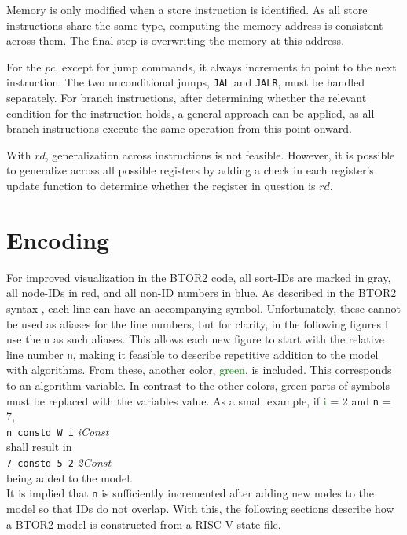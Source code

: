 Memory is only modified when a store instruction is identified. As
all store instructions share the same type, computing the memory
address is consistent across them. The final step is overwriting the
memory at this address.

For the $pc$, except for jump commands, it always increments to point
to the next instruction. The two unconditional jumps, \texttt{JAL}
and \texttt{JALR}, must be handled separately. For branch
instructions, after determining whether the relevant condition for
the instruction holds, a general approach can be applied, as all
branch instructions execute the same operation from this point
onward.

With $rd$, generalization across instructions is not feasible.
However, it is possible to generalize across all possible registers
by adding a check in each register's update function to determine
whether the register in question is $rd$.

\section{Encoding}
For improved visualization in the BTOR2 code, all sort-IDs are marked
in \textcolor{UniGrey}{gray}, all node-IDs in
\textcolor{UniRed}{red}, and all non-ID numbers in
\textcolor{UniBlue}{blue}. As described in the BTOR2 syntax
\cite[Figure 1]{btor2}, each line can have an accompanying symbol.
Unfortunately, these cannot be used as aliases for the line numbers,
but for clarity, in the following figures I use them as such aliases.
This allows each new figure to start with the relative line number
\texttt{n}, making it feasible to describe repetitive addition to the
model with algorithms. From these, another color,
\textcolor{Green}{green}, is included. This corresponds to an
algorithm variable. In contrast to the other colors, green parts of
symbols must be replaced with the variables value. As a small
example, if \textcolor{Green}{i} = 2 and \texttt{n} =
7,\\\texttt{\color{UniRed}n \color{Black}constd \color{UniGrey}W
    \color{Green}i} \textsl{\color{Green}i\color{Black}Const}\\ shall
result in \\ \texttt{\color{UniRed}7 \color{Black}constd
    \color{UniGrey}5 \color{Green}2}
\textsl{\color{Green}2\color{Black}Const}\\ being added to the
model.\\ It is implied that \texttt{n} is sufficiently incremented
after adding new nodes to the model so that IDs do not overlap. With
this, the following sections describe how a BTOR2 model is
constructed from a RISC-V state file.

